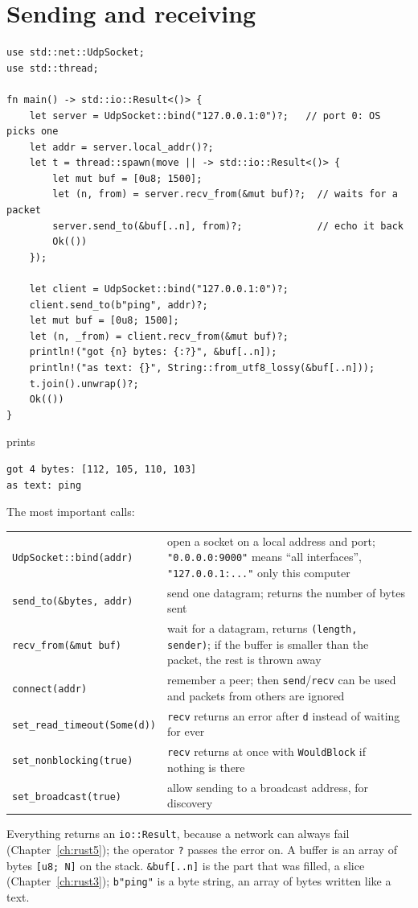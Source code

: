 \section*{Sending and receiving}
\begin{verbatim}
use std::net::UdpSocket;
use std::thread;

fn main() -> std::io::Result<()> {
    let server = UdpSocket::bind("127.0.0.1:0")?;   // port 0: OS picks one
    let addr = server.local_addr()?;
    let t = thread::spawn(move || -> std::io::Result<()> {
        let mut buf = [0u8; 1500];
        let (n, from) = server.recv_from(&mut buf)?;  // waits for a packet
        server.send_to(&buf[..n], from)?;             // echo it back
        Ok(())
    });

    let client = UdpSocket::bind("127.0.0.1:0")?;
    client.send_to(b"ping", addr)?;
    let mut buf = [0u8; 1500];
    let (n, _from) = client.recv_from(&mut buf)?;
    println!("got {n} bytes: {:?}", &buf[..n]);
    println!("as text: {}", String::from_utf8_lossy(&buf[..n]));
    t.join().unwrap()?;
    Ok(())
}
\end{verbatim}
prints
\begin{verbatim}
got 4 bytes: [112, 105, 110, 103]
as text: ping
\end{verbatim}
The most important calls:
\begin{center}
\renewcommand{\arraystretch}{1.2}
\begin{tabular}{lp{8.5cm}}
\verb!UdpSocket::bind(addr)! & open a socket on a local address and port; \verb!"0.0.0.0:9000"! means ``all interfaces'', \verb!"127.0.0.1:..."! only this computer\\
\verb!send_to(&bytes, addr)! & send one datagram; returns the number of bytes sent\\
\verb!recv_from(&mut buf)! & wait for a datagram, returns \verb!(length, sender)!; if the buffer is smaller than the packet, the rest is thrown away\\
\verb!connect(addr)! & remember a peer; then \verb!send!/\verb!recv! can be used and packets from others are ignored\\
\verb!set_read_timeout(Some(d))! & \verb!recv! returns an error after \verb!d! instead of waiting for ever\\
\verb!set_nonblocking(true)! & \verb!recv! returns at once with \verb!WouldBlock! if nothing is there\\
\verb!set_broadcast(true)! & allow sending to a broadcast address, for discovery\\
\end{tabular}
\end{center}
Everything returns an \verb!io::Result!, because a network can always fail (Chapter~\ref{ch:rust5}); the operator \verb!?! passes the error on. A buffer is an array of bytes \verb![u8; N]! on the stack. \verb!&buf[..n]! is the part that was filled, a slice (Chapter~\ref{ch:rust3}); \verb!b"ping"! is a byte string, an array of bytes written like a text.

